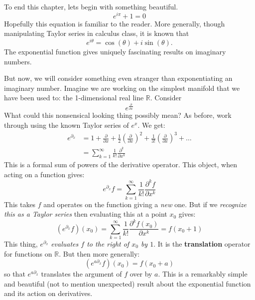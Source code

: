 		To end this chapter, lets begin with something beautiful. 
		\begin{equation*}
			e^{i \pi} + 1 = 0
		\end{equation*}
		Hopefully this equation is familiar to the reader. More generally, though manipulating Taylor series in calculus class, it is known that
		\begin{equation}
			e^{i \theta} = \cos(\theta) + i \sin(\theta).
		\end{equation}
		The exponential function gives uniquely fascinating results on imaginary numbers.
		
		But now, we will consider something even stranger than exponentiating an imaginary number. Imagine we are working on the simplest manifold that we have been used to: the 1-dimensional real line $\mathbb R$. Consider
		\begin{equation*}
			e^{\frac{\partial}{\partial x}}
		\end{equation*}
		What could this nonsensical looking thing possibly mean? As before, work through using the known Taylor series of $e^x$. We get:
		\begin{align}
			e^{\partial_x} &= 1 + \frac{\partial}{\partial x} + \frac{1}{2} \left( \frac{\partial}{\partial x} \right)^2 + \frac{1}{3!} \left( \frac{\partial}{\partial x} \right)^3 + \dots\\
			&= \sum_{k=1}^\infty \frac{1}{k!} \frac{\partial^k}{\partial x^k}
		\end{align}
		This is a formal sum of powers of the derivative operator. This object, when acting on a function gives:
		\begin{equation}
			e^{\partial_x} f = \sum_{k=1}^\infty \frac{1}{k!} \frac{\partial^k f}{\partial x^k}
		\end{equation} 
		This takes $f$ and operates on the function giving a \emph{new} one. But if we \emph{recognize this as a Taylor series} then evaluating this at a point $x_0$ gives:
		\begin{equation}
			(e^{\partial_x} f)(x_0) = \sum_{k=1}^\infty \frac{1}{k!} \frac{\partial^k f (x_0)}{\partial x^k} = f(x_0 + 1)
		\end{equation}
		This thing, $e^{\partial_x}$ \emph{evaluates $f$ to the right of $x_0$ by $1$}. It is the \textbf{translation} operator for functions on $\mathbb R$. But then more generally: 
		\begin{equation}
			(e^{a \partial_x} f) (x_0) = f(x_0 + a)
		\end{equation}
		so that $e^{a \partial_x}$ translates the argument of $f$ over by $a$. This is a remarkably simple and beautiful (not to mention unexpected) result about the exponential function and its action on derivatives.
		

